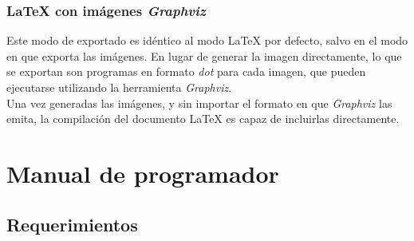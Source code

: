 \subsubsection{\LaTeX{} con imágenes \emph{Graphviz}}
Este modo de exportado es idéntico al modo \LaTeX{} por defecto, salvo en el modo en que exporta las imágenes.
En lugar de generar la imagen directamente, lo que se exportan son programas en formato \emph{dot} para cada imagen, que pueden ejecutarse utilizando la herramienta \emph{Graphviz}.
\\
Una vez generadas las imágenes, y sin importar el formato en que \emph{Graphviz} las emita, la compilación del documento \LaTeX{} es capaz de incluirlas directamente.

\section{Manual de programador}

\subsection{Requerimientos} %